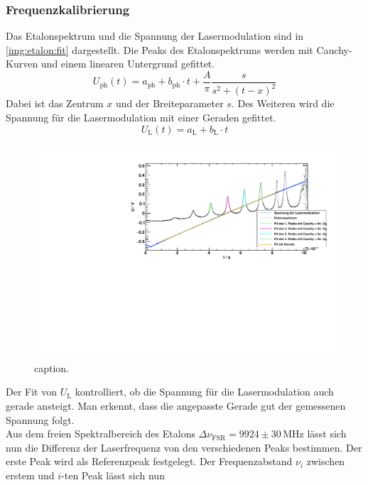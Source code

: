 \subsubsection*{Frequenzkalibrierung}  %
\label{sub:scanrate}
Das Etalonspektrum und die Spannung der Lasermodulation sind in \autoref{img:etalon:fit} dargestellt.
Die Peaks des Etalonspektrums werden mit Cauchy-Kurven und einem linearen Untergrund gefittet.
\begin{equation}
    U_\text{ph}(t) = a_\text{ph} + b_\text{ph} \cdot t + \frac{A}{\pi} \frac{s}{s^2 + (t-x)^2}
\end{equation}
Dabei ist das Zentrum $x$ und der Breiteparameter $s$.
Des Weiteren wird die Spannung für die Lasermodulation mit einer Geraden gefittet.
\begin{equation}
    U_\text{L}(t) = a_\text{L} + b_\text{L} \cdot t
\end{equation}
\begin{figure}[H]
\begin{center}
    \includegraphics[width=\textwidth]{../img/part2/up-etalon_zoom_fit.pdf}
    \caption{caption.}
    \label{img:etalon:fit}
\end{center}
\end{figure}
Der Fit von $U_\text{L}$ kontrolliert, ob die Spannung für die Lasermodulation auch gerade ansteigt. Man erkennt, dass die angepasste Gerade
gut der gemessenen Spannung folgt.\\
Aus dem freien Spektralbereich des Etalons $\Delta \nu_\text{FSR} = 9924 \pm 30\,\text{MHz}$ lässt sich nun die Differenz der Laserfrequenz von den verschiedenen
Peaks bestimmen. Der erste Peak wird als Referenzpeak festgelegt. Der Frequenzabstand $\nu_i$ zwischen erstem und $i$-ten Peak lässt sich nun
